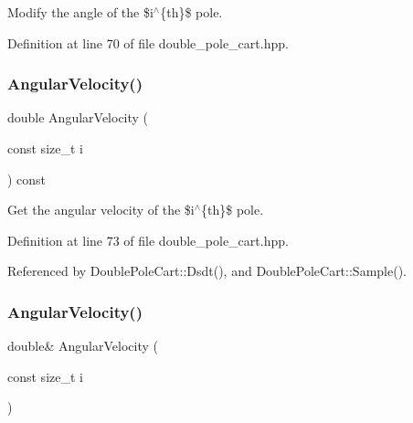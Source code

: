 Modify the angle of the \$i$^\wedge$\{th\}\$ pole. 



Definition at line 70 of file double\+\_\+pole\+\_\+cart.\+hpp.

\mbox{\label{classmlpack_1_1rl_1_1DoublePoleCart_1_1State_adee020824f1381e77738134cb3e74c70}} 
\subsubsection{Angular\+Velocity()\hspace{0.1cm}{\footnotesize\ttfamily [1/2]}}
{\footnotesize\ttfamily double Angular\+Velocity (\begin{DoxyParamCaption}\item[{const size\+\_\+t}]{i }\end{DoxyParamCaption}) const\hspace{0.3cm}{\ttfamily [inline]}}



Get the angular velocity of the \$i$^\wedge$\{th\}\$ pole. 



Definition at line 73 of file double\+\_\+pole\+\_\+cart.\+hpp.



Referenced by Double\+Pole\+Cart\+::\+Dsdt(), and Double\+Pole\+Cart\+::\+Sample().

\mbox{\label{classmlpack_1_1rl_1_1DoublePoleCart_1_1State_a340295a3f85f51b12475ae54dfae1021}} 
\subsubsection{Angular\+Velocity()\hspace{0.1cm}{\footnotesize\ttfamily [2/2]}}
{\footnotesize\ttfamily double\& Angular\+Velocity (\begin{DoxyParamCaption}\item[{const size\+\_\+t}]{i }\end{DoxyParamCaption})\hspace{0.3cm}{\ttfamily [inline]}}



